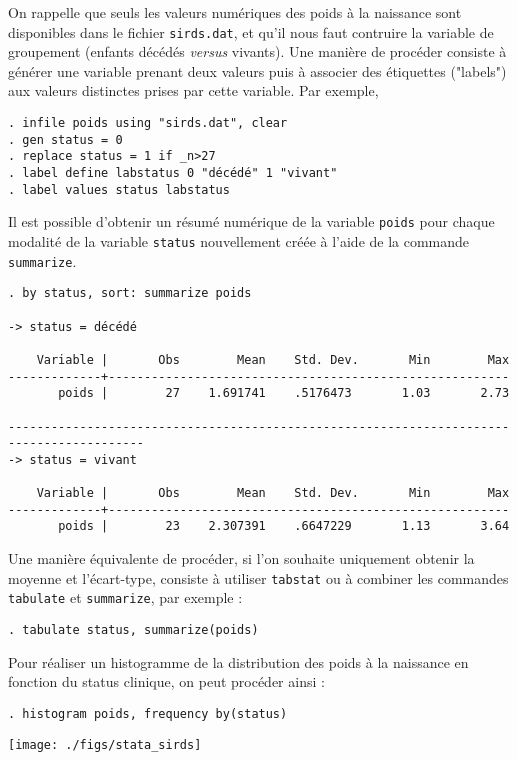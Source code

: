 \soln{\ref{exo:9.1}} On rappelle que seuls les valeurs numériques des poids
à la naissance sont disponibles dans le fichier \texttt{sirds.dat}, et qu'il
nous faut contruire la variable de groupement (enfants décédés \emph{versus}
vivants). Une manière de procéder consiste à générer une variable prenant
deux valeurs puis à associer des étiquettes ("labels") aux valeurs
distinctes prises par cette variable. Par exemple,
\begin{verbatim}
. infile poids using "sirds.dat", clear
. gen status = 0
. replace status = 1 if _n>27
. label define labstatus 0 "décédé" 1 "vivant"
. label values status labstatus
\end{verbatim}

Il est possible d'obtenir un résumé numérique de la variable \texttt{poids}
pour chaque modalité de la variable \texttt{status} nouvellement créée à
l'aide de la commande \verb|summarize|.
\begin{verbatim}
. by status, sort: summarize poids

-> status = décédé

    Variable |       Obs        Mean    Std. Dev.       Min        Max
-------------+--------------------------------------------------------
       poids |        27    1.691741    .5176473       1.03       2.73

-----------------------------------------------------------------------------------------
-> status = vivant

    Variable |       Obs        Mean    Std. Dev.       Min        Max
-------------+--------------------------------------------------------
       poids |        23    2.307391    .6647229       1.13       3.64
\end{verbatim}
Une manière équivalente de procéder, si l'on souhaite uniquement obtenir la
moyenne et l'écart-type, consiste à utiliser \texttt{tabstat} ou à combiner
les commandes \texttt{tabulate} et \texttt{summarize}, par exemple :
\begin{verbatim}
. tabulate status, summarize(poids)
\end{verbatim}

Pour réaliser un histogramme de la distribution des poids à la naissance en
fonction du status clinique, on peut procéder ainsi :
\begin{verbatim}
. histogram poids, frequency by(status)
\end{verbatim}
\texttt{[image: ./figs/stata\_sirds]}

